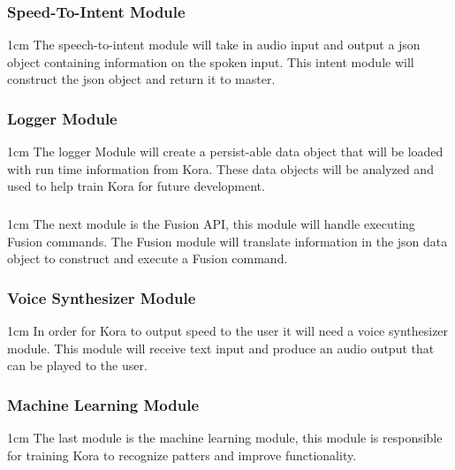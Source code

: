 \documentclass[onecolumn, draftclsnofoot,10pt, compsoc]{IEEEtran}
\def \botname{Kora\xspace}
\newenvironment{indentItem}[1][1cm]{\begin{adjustwidth}{#1}{}}{\end{adjustwidth}}
\begin{document}
		\subsubsection{Speed-To-Intent Module}
			\begin{indentItem}
				The speech-to-intent module will take in audio input and output a json object containing information on the spoken input.
				This intent module will construct the json object and return it to master.
			\end{indentItem}
		\subsubsection{Logger Module}
			\begin{indentItem}
				The logger Module will create a persist-able data object that will be loaded with run time information from \botname.
				These data objects will be analyzed and used to help train \botname for future development.
			\end{indentItem}
		\subsubsection{}
			\begin{indentItem}
				The next module is the Fusion API, this module will handle executing Fusion commands.
				The Fusion module will translate information in the json data object to construct and execute a Fusion command.
			\end{indentItem}
		\subsubsection{Voice Synthesizer Module}
			\begin{indentItem}
				In order for \botname to output speed to the user it will need a voice synthesizer module.
				This module will receive text input and produce an audio output that can be played to the user.
			\end{indentItem}		
		\subsubsection{Machine Learning Module}
			\begin{indentItem}
				The last module is the machine learning module, this module is responsible for training \botname to recognize patters and improve functionality.
			\end{indentItem}
		
\end{document}
